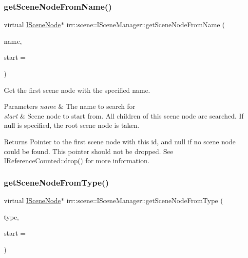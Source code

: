 \subsubsection{\texorpdfstring{get\+Scene\+Node\+From\+Name()}{getSceneNodeFromName()}}
{\footnotesize\ttfamily virtual \hyperlink{classirr_1_1scene_1_1ISceneNode}{I\+Scene\+Node}$\ast$ irr\+::scene\+::\+I\+Scene\+Manager\+::get\+Scene\+Node\+From\+Name (\begin{DoxyParamCaption}\item[{const \hyperlink{namespaceirr_a9395eaea339bcb546b319e9c96bf7410}{c8} $\ast$}]{name,  }\item[{\hyperlink{classirr_1_1scene_1_1ISceneNode}{I\+Scene\+Node} $\ast$}]{start = {} }\end{DoxyParamCaption})\hspace{0.3cm}{\ttfamily [pure virtual]}}



Get the first scene node with the specified name. 


\begin{DoxyParams}{Parameters}
{\em name} & The name to search for \\
\hline
{\em start} & Scene node to start from. All children of this scene node are searched. If null is specified, the root scene node is taken. \\
\hline
\end{DoxyParams}
\begin{DoxyReturn}{Returns}
Pointer to the first scene node with this id, and null if no scene node could be found. This pointer should not be dropped. See \hyperlink{classirr_1_1IReferenceCounted_a03856a09355b89d178090c4a5f738543}{I\+Reference\+Counted\+::drop()} for more information. 
\end{DoxyReturn}
\mbox{\label{classirr_1_1scene_1_1ISceneManager_a5ab8e8f8cc8456a3ea881c75dfe505bb}} 
\subsubsection{\texorpdfstring{get\+Scene\+Node\+From\+Type()}{getSceneNodeFromType()}}
{\footnotesize\ttfamily virtual \hyperlink{classirr_1_1scene_1_1ISceneNode}{I\+Scene\+Node}$\ast$ irr\+::scene\+::\+I\+Scene\+Manager\+::get\+Scene\+Node\+From\+Type (\begin{DoxyParamCaption}\item[{\hyperlink{namespaceirr_1_1scene_acad3d7ef92a9807d391ba29120f3b7bd}{scene\+::\+E\+S\+C\+E\+N\+E\+\_\+\+N\+O\+D\+E\+\_\+\+T\+Y\+PE}}]{type,  }\item[{\hyperlink{classirr_1_1scene_1_1ISceneNode}{I\+Scene\+Node} $\ast$}]{start = {} }\end{DoxyParamCaption})\hspace{0.3cm}{\ttfamily [pure virtual]}}




